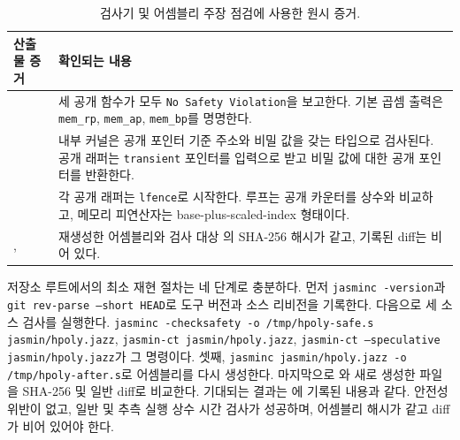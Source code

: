 \documentclass[10pt,twocolumn]{article}
\newcommand{\ct}{상수 시간}
\begin{document}
\begin{table}[t]
\centering
\scriptsize
\setlength{\tabcolsep}{3pt}
\begin{tabular}{P{0.35\columnwidth}P{0.55\columnwidth}}
\toprule
산출물 증거 & 확인되는 내용 \\
\midrule
{} &
세 공개 함수가 모두 \texttt{No Safety Violation}을 보고한다. 기본
곱셈 출력은 \texttt{mem\_rp}, \texttt{mem\_ap},
\texttt{mem\_bp}를 명명한다. \\
 &
내부 커널은 공개 포인터 기준 주소와 비밀 값을 갖는 타입으로 검사된다.
공개 래퍼는 \texttt{transient} 포인터를 입력으로 받고 비밀 값에 대한 공개
포인터를 반환한다. \\
 &
각 공개 래퍼는 \texttt{lfence}로 시작한다. 루프는 공개 카운터를
상수와 비교하고, 메모리 피연산자는 base-plus-scaled-index 형태이다. \\
,  &
재생성한 어셈블리와 검사 대상 의 SHA-256 해시가 같고,
기록된 diff는 비어 있다. \\
\bottomrule
\end{tabular}
\caption{검사기 및 어셈블리 주장 점검에 사용한 원시 증거.}
\label{tab:raw-evidence}
\end{table}

저장소 루트에서의 최소 재현 절차는 네 단계로 충분하다. 먼저
\texttt{jasminc -version}과 \texttt{git rev-parse --short HEAD}로 도구
버전과 소스 리비전을 기록한다. 다음으로 세 소스 검사를 실행한다.
\texttt{jasminc -checksafety -o /tmp/hpoly-safe.s jasmin/hpoly.jazz},
\texttt{jasmin-ct jasmin/hpoly.jazz},
\texttt{jasmin-ct --speculative jasmin/hpoly.jazz}가 그 명령이다. 셋째,
\texttt{jasminc jasmin/hpoly.jazz -o /tmp/hpoly-after.s}로 어셈블리를
다시 생성한다. 마지막으로 와 새로 생성한 파일을 SHA-256
및 일반 diff로 비교한다. 기대되는 결과는 에 기록된
내용과 같다. 안전성 위반이 없고, 일반 및 추측 실행 \ct{} 검사가
성공하며, 어셈블리 해시가 같고 diff가 비어 있어야 한다.
\end{document}
